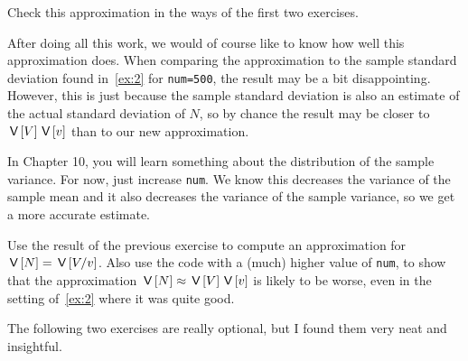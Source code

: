 \documentclass[assignments]{subfiles}
\begin{document}
\begin{exercise}
Check this approximation in the ways of the first two exercises.
\end{exercise}



After doing all this work, we would of course like to know how well this approximation does.
When comparing the approximation to the sample standard deviation found in~\cref{ex:2} for \texttt{num=500}, the result may be a bit disappointing.
However, this is just because the sample standard deviation is also an estimate of the actual standard deviation of $N$, so by chance the result may be closer to $\,\mathsf{V}\left[V\right] \,\mathsf{V}\left[v\right]$ than to our new approximation.

 In Chapter 10, you will learn something about the distribution of the sample variance. For now, just increase  \texttt{num}. We know this decreases the variance of the sample mean and it also decreases the variance of the sample variance, so we get a more accurate estimate.

\begin{exercise} Use the result of the previous exercise to compute an approximation for $\,\mathsf{V}\left[N\right]  = \,\mathsf{V}\left[V/v\right]$. Also use the code with a (much) higher value of \texttt{num}, to show that the approximation $\,\mathsf{V}\left[N\right]  \approx \,\mathsf{V}\left[V\right] \,\mathsf{V}\left[v\right]$ is likely to be worse, even in the setting of~\cref{ex:2} where it was quite good.
\end{exercise}

The following two exercises are really optional, but I found them very neat and insightful.
\end{document}

